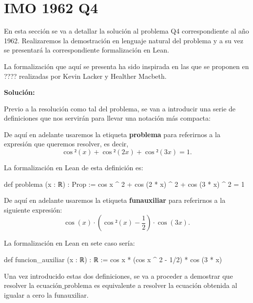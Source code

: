 \section{IMO 1962 Q4}

En esta sección se va a detallar la solución al problema Q4
correspondiente al año 1962. Realizaremos la demostración
en lenguaje natural del problema y a su vez se presentará la
correspondiente formalización en Lean.

La formalización que aquí se presenta ha sido inspirada en
las que se proponen en ???? realizadas por Kevin Lacker y
Healther Macbeth.



\noindent
{}

\textbf{Solución:}

Previo a la resolución como tal del problema, se van a
introducir una serie de definiciones que nos servirán
para llevar una notación más compacta:

\begin{definicion}\label{problema}
  De aquí en adelante usaremos la etiqueta \textbf{problema}
  para referirnos a la expresión que queremos resolver,
  es decir,
  \begin{equation}\label{expprob}
    \cos²(x)+\cos²(2x)+\cos²(3x)=1.
  \end{equation}
\end{definicion}

La formalización en Lean de esta definición es:
\begin{leancode}
 def problema (x : ℝ) : Prop :=
 cos x ^ 2 + cos (2 * x) ^ 2 + cos (3 * x) ^ 2 = 1
\end{leancode}

\begin{definicion}\label{funaux}
  De aquí en adelante usaremos la etiqueta
  \textbf{funauxiliar} para referirnos a la siguiente
  expresión:
  \begin{equation*}
    \cos(x)·(\cos²(x)-\frac{1}{2})·\cos(3x).
  \end{equation*}
\end{definicion}

La formalización en Lean en sete caso sería:
\begin{leancode}
def funcion_auxiliar (x : ℝ) : ℝ :=
cos x * (cos x ^ 2 - 1/2) * cos (3 * x)
\end{leancode}

Una vez introducido estas dos definiciones, se va a proceder
a demostrar que resolver la ecuación\( \_ \)problema es
equivalente a resolver la ecuación obtenida al igualar a
cero la funauxiliar.

